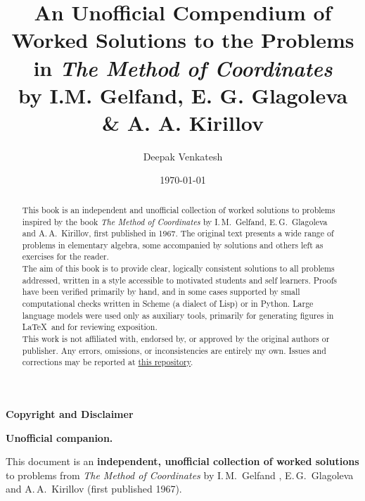 \documentclass[10pt]{article}
\title {An Unofficial Compendium of Worked Solutions to the Problems in \textit{The Method of Coordinates}\\
[0.5em]\large by I.M. Gelfand, E. G. Glagoleva \& A. A. Kirillov}
\author{Deepak Venkatesh}
\date{\today}
\begin{document}
\noindent
\maketitle
\begin{abstract}
\noindent
This book is an independent and unofficial collection of worked solutions
to problems inspired by the book \textit{The Method of Coordinates} by I.\,M.~Gelfand, E.\,G.~Glagoleva and A.\,A.~Kirillov,
first published in 1967. The original text presents a wide range of problems
in elementary algebra, some accompanied by solutions and others left as exercises
for the reader.\\

\noindent
The aim of this book is to provide clear, logically consistent solutions
to all problems addressed, written in a style accessible to motivated students
and self learners. Proofs have been verified primarily by hand, and in some cases
supported by small computational checks written in Scheme (a dialect of Lisp) or in Python.
Large language models were used only as auxiliary tools, primarily for generating
figures in \LaTeX\ and for reviewing exposition.\\

\noindent
This work is not affiliated with, endorsed by, or approved by the original authors
or publisher. Any errors, omissions, or inconsistencies are entirely my own.
Issues and corrections may be reported at
\href{https://github.com/deepak-venkatesh/gelfand-method-coordinates}{this repository}.
\end{abstract}

\clearpage
\thispagestyle{empty}

\vspace*{2cm}

\begin{center}
  {\Large \textbf{Copyright and Disclaimer}}
\end{center}

\vspace{1cm}

\noindent
\textbf{Unofficial companion.}

\vspace{0.4cm}

\noindent
This document is an \textbf{independent, unofficial collection of worked solutions}
to problems from \textit{The Method of Coordinates} by I.\,M.~Gelfand , E.\,G.~Glagoleva and A.\,A.~Kirillov (first published 1967).

\vspace{0.4cm}
\end{document}
